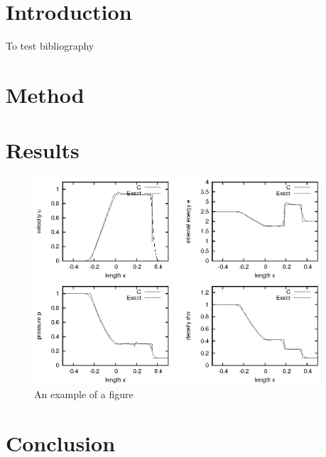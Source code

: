 \documentclass{report}
\begin{document}


\tableofcontents
\chapter{Introduction}
\label{sec:intro}
To test bibliography~\cite{Monaghan2005}

\chapter{Method}
\label{sec:method}

\chapter{Results}
\begin{figure}[h]
  \centering
  \includegraphics[width=0.95\textwidth]{img/1dshock.eps}
  \caption{An example of a figure}
  \label{fig:1dshock}
\end{figure}
\label{sec:results}

\chapter{Conclusion}
\label{sec:conclusion}



\end{document}

